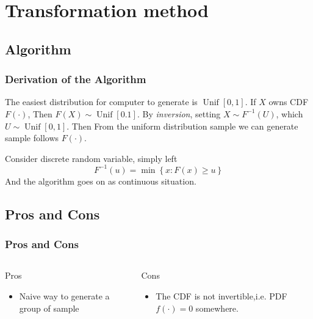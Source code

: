 \section{Transformation method}
\subsection{Algorithm}

\begin{frame}
    \frametitle{Derivation of the Algorithm}

    The easiest distribution for computer to generate is \(\operatorname{Unif}[0,1]\). If \(X\) owns CDF \(F(\cdot)\), Then \(F(X) \sim \operatorname{Unif}[0.1]\). By \textit{inversion}, setting \(X \sim F^{-1}(U)\), which \(U \sim \operatorname{Unif}[0,1]\). Then From the uniform distribution sample we can generate sample follows \(F(\cdot)\).
    \vspace*{1em}

    \pause

    Consider discrete random variable, simply left
    \[F^{-1} (u) = \min\left\{x:F(x)\geq u\right\}\]
    And the algorithm goes on as continuous situation.

\end{frame}
\subsection{Pros and Cons}
\begin{frame}
    \frametitle{Pros and Cons}
    \begin{columns}
        \begin{block}{Pros}
            \begin{itemize}
                \item Naive way to generate a group of sample
                \\
            \end{itemize}
        \end{block}
        
        \begin{block}{Cons}
            \begin{itemize}
                \item The CDF is not invertible,i.e. PDF \(f(\cdot) = 0\) somewhere.
            \end{itemize}
        \end{block}

        
    \end{columns}
    
\end{frame}
